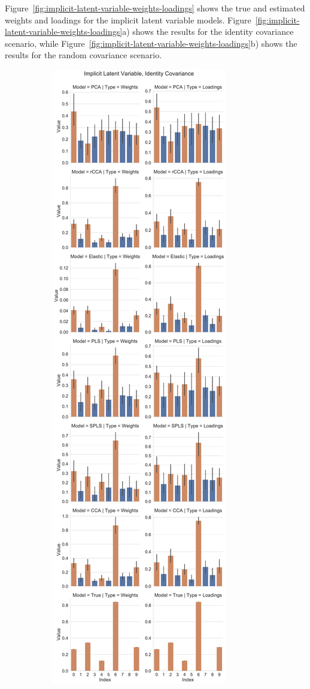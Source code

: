 Figure~\ref{fig:implicit-latent-variable-weights-loadings} shows the true and estimated \gls{weights} and \gls{loadings} for the implicit latent variable models.
Figure~\ref{fig:implicit-latent-variable-weights-loadings}a) shows the results for the identity covariance scenario, while Figure~\ref{fig:implicit-latent-variable-weights-loadings}b) shows the results for the random covariance scenario.


\begin{figure}
    \centering
    \begin{subfigure}{0.49\linewidth}
        \centering
        \includegraphics[width=\linewidth]{figures/simulated/low/Combined_Weights_Loadings_with_Error_Bars_Identity_Covariance_implicit}

\end{subfigure}
\end{figure}

